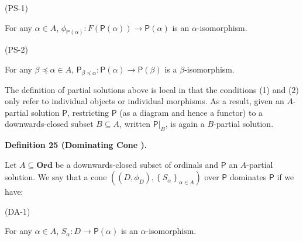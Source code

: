 \par\noindent  (PS-1) 
 
For any $\alpha\in A$, $\phi_{\boldsymbol{\mathsf{P}}(\alpha)}:F(\boldsymbol{\mathsf{P}}(\alpha))\to\boldsymbol{\mathsf{P}}(\alpha)$ is an $\alpha$-isomorphism.\par
 
 
 
\par\noindent  (PS-2) 
 
For any $\beta\preceq\alpha\in A$, $\boldsymbol{\mathsf{P}}_{\beta\preceq\alpha}:\boldsymbol{\mathsf{P}}(\alpha)\to\boldsymbol{\mathsf{P}}(\beta)$ is a $\beta$-isomorphism.\par
 
 
  
 
 
 
The definition of partial solutions above is local in that the conditions (1) and (2) only refer to individual objects or individual morphisms. As a result, given an $A$-partial solution $\boldsymbol{\mathsf{P}}$, restricting $\boldsymbol{\mathsf{P}}$ (as a diagram and hence a functor) to a downwards-closed subset $B\subseteq A$, written ${\left.\boldsymbol{\mathsf{P}}\right|}_{B}$, is again a $B$-partial solution.\par
 
 
 
\par\medskip\noindent\textbf{Definition 25 (Dominating Cone ).}\par
 
 
Let $A\subseteq\mathbf{Ord}$ be a downwards-closed subset of ordinals and $\boldsymbol{\mathsf{P}}$ an $A$-partial solution. We say that a cone $((D,\phi_{D}),\left\{S_{\alpha}\right\}_{\alpha\in A})$ over $\boldsymbol{\mathsf{P}}$ dominates $\boldsymbol{\mathsf{P}}$ if we have:\par
  
\par\noindent  (DA-1) 
 
For any $\alpha\in A$, $S_{\alpha}:D\to\boldsymbol{\mathsf{P}}(\alpha)$ is an $\alpha$-isomorphism.\par
 
